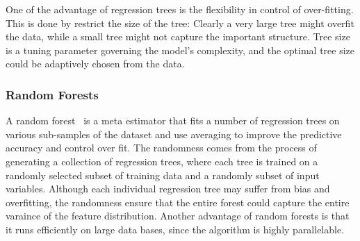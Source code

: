 One of the advantage of regression trees is the flexibility in control of over-fitting.
This is done by restrict the size of the tree: Clearly a very large tree might overfit the data, while a small tree might not capture the important structure.
Tree size is a tuning parameter governing the model's complexity, and the optimal tree size could be adaptively chosen from the data.

\subsubsection{Random Forests}
\label{ssub:random_forests}
A random forest~\cite{breiman2001random} is a meta estimator that fits a number of regression trees on various sub-samples of the dataset and use averaging to improve the predictive accuracy and control over fit.
The randomness comes from the process of generating a collection of regression trees, where each tree is trained on a randomly selected subset of training data and a randomly subset of input variables.
Although each individual regression tree may suffer from bias and overfitting, the randomness ensure that the entire forest could capture the entire varaince of the feature distribution.
Another advantage of random forests is that it runs efficiently on large data bases, since the algorithm is highly parallelable.

